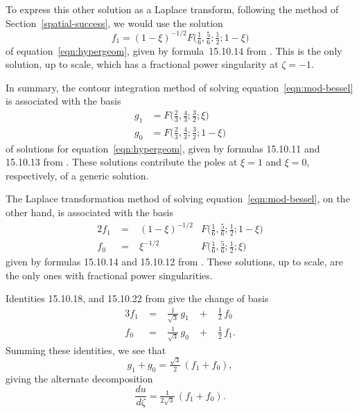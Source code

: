 \documentclass{article}
\theoremstyle{plain}
\begin{document}
To express this other solution as a Laplace transform, following the method of Section~\ref{spatial-success}, we would use the solution
\[ f_1 = (1-\xi)^{-1/2} F\big(\tfrac{1}{6}, \tfrac{5}{6}; \tfrac{1}{2}; 1-\xi\big) \]
of equation~\ref{eqn:hypergeom}, given by formula~15.10.14 from \cite{dlmf}. This is the only solution, up to scale, which has a fractional power singularity at $\zeta = -1$.

In summary, the contour integration method of solving equation~\ref{eqn:mod-bessel} is associated with the basis
\begin{align*}
g_1 & = F\big(\tfrac{2}{3}, \tfrac{4}{3}; \tfrac{3}{2}; \xi\big) \\
g_0 & = F\big(\tfrac{2}{3}, \tfrac{4}{3}; \tfrac{3}{2}; 1-\xi\big)
\end{align*}
of solutions for equation~\ref{eqn:hypergeom}, given by formulas 15.10.11 and 15.10.13 from \cite{dlmf}. These solutions contribute the poles at $\xi = 1$ and $\xi = 0$, respectively, of a generic solution.

The Laplace transformation method of solving equation~\ref{eqn:mod-bessel}, on the other hand, is associated with the basis
\begin{alignat*}{2}
f_1 &\;=\;& (1-\xi)^{-1/2} & F\big(\tfrac{1}{6}, \tfrac{5}{6}; \tfrac{1}{2}; 1-\xi\big) \\
f_0 &\;=\:& \xi^{-1/2} & F\big(\tfrac{1}{6}, \tfrac{5}{6}; \tfrac{1}{2}; \xi\big)
\end{alignat*}
given by formulas 15.10.14 and 15.10.12 from \cite{dlmf}. These solutions, up to scale, are the only ones with fractional power singularities.

Identities 15.10.18, and 15.10.22 from \cite{dlmf} give the change of basis
\begin{alignat*}{3}
f_1 &\;=\;&\tfrac{1}{\sqrt{3}}\,g_1 &\;+\;& \tfrac{1}{2}\,f_0 \\
f_0 &\;=\;& \tfrac{1}{\sqrt{3}}\,g_0 &\;+\;& \tfrac{1}{2}\,f_1.
\end{alignat*}
Summing these identities, we see that
\[ g_1 + g_0 = \tfrac{\sqrt{3}}{2}\,(f_1 + f_0), \]
giving the alternate decomposition
\[ \frac{du}{d\zeta} = \tfrac{1}{2\sqrt{3}}\,(f_1 + f_0). \]
\end{document}
